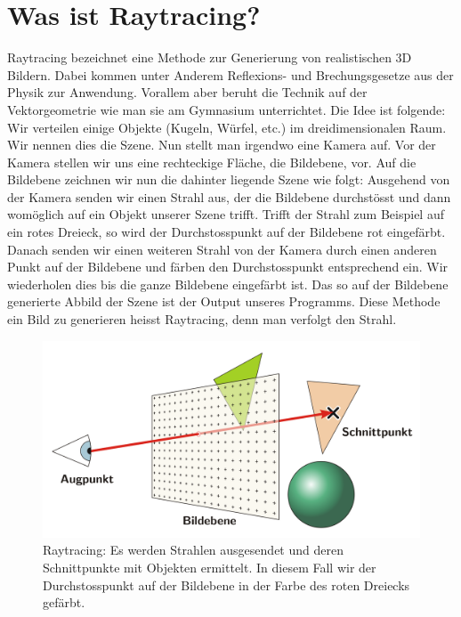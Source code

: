 \documentclass[12pt,a4paper]{article}
\begin{document}
	\section*{Was ist Raytracing?}
	Raytracing bezeichnet eine Methode zur Generierung von realistischen 3D Bildern.
	Dabei kommen unter Anderem Reflexions- und Brechungsgesetze aus der Physik zur Anwendung.
	Vorallem aber beruht die Technik auf der Vektorgeometrie wie man sie am Gymnasium unterrichtet.
	Die Idee ist folgende: Wir verteilen einige Objekte (Kugeln, Würfel, etc.) im dreidimensionalen Raum.
	Wir nennen dies die Szene.
	Nun stellt man irgendwo eine Kamera auf.
	Vor der Kamera stellen wir uns eine rechteckige Fläche, die Bildebene, vor.
	Auf die Bildebene zeichnen wir nun die dahinter liegende Szene wie folgt:
	Ausgehend von der Kamera senden wir einen Strahl aus, der die Bildebene durchstösst und dann womöglich auf ein Objekt unserer Szene trifft.
	Trifft der Strahl zum Beispiel auf ein rotes Dreieck, so wird der Durchstosspunkt auf der Bildebene rot eingefärbt.
	Danach senden wir einen weiteren Strahl von der Kamera durch einen anderen Punkt auf der Bildebene und färben den Durchstosspunkt entsprechend ein.
	Wir wiederholen dies bis die ganze Bildebene eingefärbt ist.
	Das so auf der Bildebene generierte Abbild der Szene ist der Output unseres Programms.
	Diese Methode ein Bild zu generieren heisst Raytracing, denn man verfolgt den Strahl.
	\begin{figure}[h!]
		\centering
		\includegraphics[width=\textwidth]{images/raytracing.png}
		\caption{Raytracing: Es werden Strahlen ausgesendet und deren Schnittpunkte mit Objekten ermittelt. In diesem Fall wir der Durchstosspunkt auf der Bildebene in der Farbe des roten Dreiecks gefärbt.}
		\label{fig:raytracing}
	\end{figure}
\end{document}
